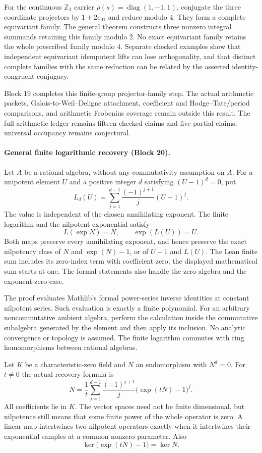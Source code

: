 \documentclass[11pt]{article}
\theoremstyle{definition}
\theoremstyle{remark}
\begin{document}
For the continuous $\mathbb Z_2$ carrier
$\rho(s)=\operatorname{diag}(1,-1,1)$, conjugate the three coordinate
projectors by $1+2e_{01}$ and reduce modulo $4$. They form a complete
equivariant family. The general theorem constructs three nonzero integral
summands retaining this family modulo $2$. No exact equivariant family
retains the whole prescribed family modulo $4$. Separate checked examples
show that independent equivariant idempotent lifts can lose orthogonality,
and that distinct complete families with the same reduction can be related
by the asserted identity-congruent conjugacy.

Block 19 completes this finite-group projector-family step. The actual
arithmetic packets, Galois-to-Weil--Deligne attachment, coefficient and
Hodge--Tate/period comparisons, and arithmetic Frobenius coverage remain
outside this result. The full arithmetic ledger remains fifteen checked
claims and five partial claims; universal occupancy remains conjectural.


\paragraph{General finite logarithmic recovery (Block 20).}
Let $A$ be a rational algebra, without any commutativity assumption on $A$.
For a unipotent element $U$ and a positive integer $d$ satisfying
$(U-1)^d=0$, put
\[
L_d(U)=\sum_{j=1}^{d-1}\frac{(-1)^{j+1}}{j}(U-1)^j.
\]
The value is independent of the chosen annihilating exponent. The finite
logarithm and the nilpotent exponential satisfy
\[
L(\exp N)=N,\qquad \exp(L(U))=U.
\]
Both maps preserve every annihilating exponent, and hence preserve the
exact nilpotency class of $N$ and $\exp(N)-1$, or of $U-1$ and $L(U)$.
The Lean finite sum includes its zero-index term with coefficient zero;
the displayed mathematical sum starts at one. The formal statements also
handle the zero algebra and the exponent-zero case.

The proof evaluates Mathlib's formal power-series inverse identities at
constant nilpotent series. Such evaluation is exactly a finite polynomial.
For an arbitrary noncommutative ambient algebra, perform the calculation
inside the commutative subalgebra generated by the element and then apply
its inclusion. No analytic convergence or topology is assumed. The
finite logarithm commutes with ring homomorphisms between rational algebras.

Let $K$ be a characteristic-zero field and $N$ an endomorphism with
$N^d=0$. For $t\ne0$ the actual recovery formula is
\[
N=\frac1t\sum_{j=1}^{d-1}\frac{(-1)^{j+1}}{j}
       \bigl(\exp(tN)-1\bigr)^j.
\]
All coefficients lie in $K$. The vector spaces need not be finite
dimensional, but nilpotence still means that some finite power of the
whole operator is zero. A linear map intertwines two nilpotent operators exactly
when it intertwines their exponential samples at a common nonzero
parameter. Also
\[
\ker\bigl(\exp(tN)-1\bigr)=\ker N.
\]
\end{document}
